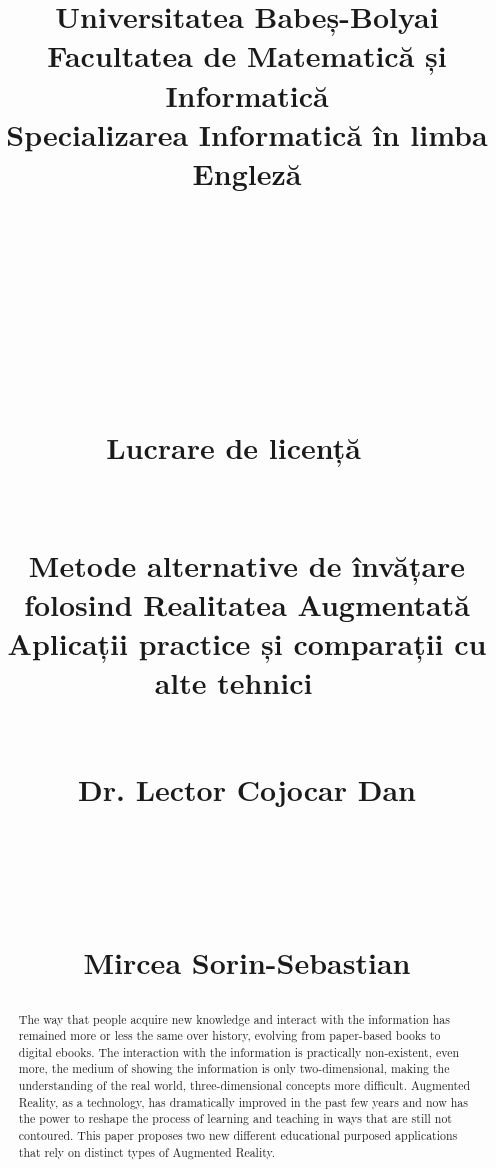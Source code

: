 \documentclass[12 pct]{report}
\begin{document}
\begin{titlepage}
\title{%
  { \huge Universitatea Babeș-Bolyai\\
  Facultatea de Matematică și Informatică\\
  Specializarea Informatică în limba Engleză \\
  }
  \ \\
  \ \\
  \ \\
  \ \\
  \ \\
  \ \\
  {\huge Lucrare de licență}
  \ \\
  \ \\
  \ \\
  Metode alternative de învățare folosind Realitatea Augmentată\\
  Aplicații practice și comparații cu alte tehnici
  \ \\
  \ \\
  {%
    \begin{flushleft}%
  	 Dr. Lector  Cojocar Dan
  	\end{flushleft}}
  \ \\
  \ \\
  {%
  \begin{flushright}
  	Mircea Sorin-Sebastian
  \end{flushright} }
}%
\maketitle
\end{titlepage}

\begin{abstract}
The way that people acquire new knowledge and interact with the information has remained more or less the same over history, evolving from paper-based books to digital ebooks. 
The interaction with the information is practically non-existent, even more, the medium of showing the information is only two-dimensional, making the understanding of the real world, three-dimensional concepts more difficult. 
Augmented Reality, as a technology, has dramatically improved in the past few years and now has the power to reshape the process of learning and teaching in ways that are still not contoured. 
This paper proposes two new different educational purposed applications that rely on distinct types of Augmented Reality.
\end{abstract}

\tableofcontents
\end{document}
